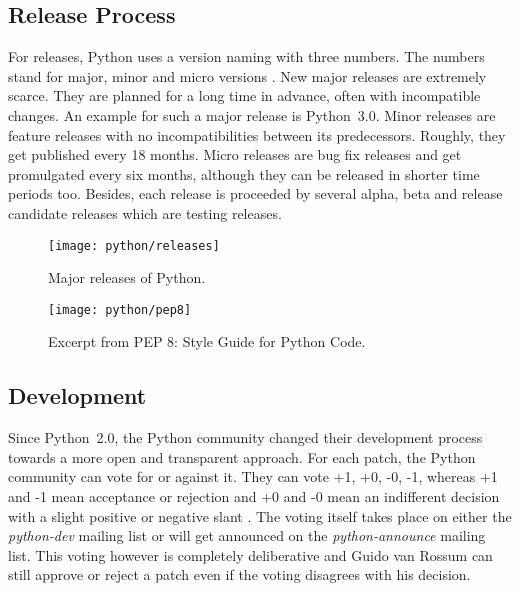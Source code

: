 
\subsection{Release Process} %

For releases, Python uses a version naming with three numbers. The numbers
stand for major, minor and micro versions
\cite{PythonDevelopmentCycle,Warsaw2001}. New major releases are extremely
scarce. They are planned for a long time in advance, often with incompatible
changes. An example for such a major release is Python~3.0. Minor releases are
feature releases with no incompatibilities between its predecessors. Roughly,
they get published every 18 months. Micro releases are bug fix releases and get
promulgated every six months, although they can be released in shorter time
periods too. Besides, each release is proceeded by several alpha, beta and
release candidate releases which are testing releases.

\vfill
\begin{figure}[bhtp]
  \centering
  \texttt{[image: python/releases]}
  \caption[Major Releases of Python]{Major releases of Python.}
\end{figure}

\begin{figure}[htbp]
  \centering
  \texttt{[image: python/pep8]}
  \caption[Excerpt from \acl{PEP} 8]{Excerpt from \acs{PEP} 8: Style Guide for Python Code.}
\end{figure}


\subsection{Development} %

Since Python~2.0, the Python community changed their development process
towards a more open and transparent approach. For each patch, the Python
community can vote for or against it. They can vote +1, +0, -0, -1, whereas +1
and -1 mean acceptance or rejection and +0 and -0 mean an indifferent decision
with a slight positive or negative slant \cite{Warsaw2002}. The voting itself
takes place on either the \emph{python-dev} mailing list or will get announced
on the \emph{python-announce} mailing list. This voting however is completely
deliberative and Guido van Rossum can still approve or reject a patch even if
the voting disagrees with his decision.

